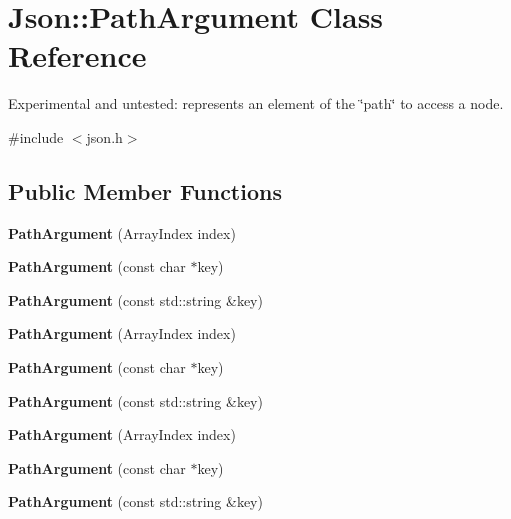 \section{Json\+:\+:Path\+Argument Class Reference}
\label{class_json_1_1_path_argument}


Experimental and untested\+: represents an element of the \char`\"{}path\char`\"{} to access a node.  




{\ttfamily \#include $<$json.\+h$>$}

\subsection*{Public Member Functions}
\begin{DoxyCompactItemize}
\item 
{\bfseries Path\+Argument} (Array\+Index index)\label{class_json_1_1_path_argument_a53c5b27143b161301b95fd544c139ecf}

\item 
{\bfseries Path\+Argument} (const char $\ast$key)\label{class_json_1_1_path_argument_a9690417a8a40e6e49f2acdf6c9281345}

\item 
{\bfseries Path\+Argument} (const std\+::string \&key)\label{class_json_1_1_path_argument_a08f872cfee4fc600f7fa3bcaaff0d41c}

\item 
{\bfseries Path\+Argument} (Array\+Index index)\label{class_json_1_1_path_argument_a53c5b27143b161301b95fd544c139ecf}

\item 
{\bfseries Path\+Argument} (const char $\ast$key)\label{class_json_1_1_path_argument_a9690417a8a40e6e49f2acdf6c9281345}

\item 
{\bfseries Path\+Argument} (const std\+::string \&key)\label{class_json_1_1_path_argument_a08f872cfee4fc600f7fa3bcaaff0d41c}

\item 
{\bfseries Path\+Argument} (Array\+Index index)\label{class_json_1_1_path_argument_a53c5b27143b161301b95fd544c139ecf}

\item 
{\bfseries Path\+Argument} (const char $\ast$key)\label{class_json_1_1_path_argument_a9690417a8a40e6e49f2acdf6c9281345}

\item 
{\bfseries Path\+Argument} (const std\+::string \&key)\label{class_json_1_1_path_argument_a08f872cfee4fc600f7fa3bcaaff0d41c}


\end{DoxyCompactItemize}
